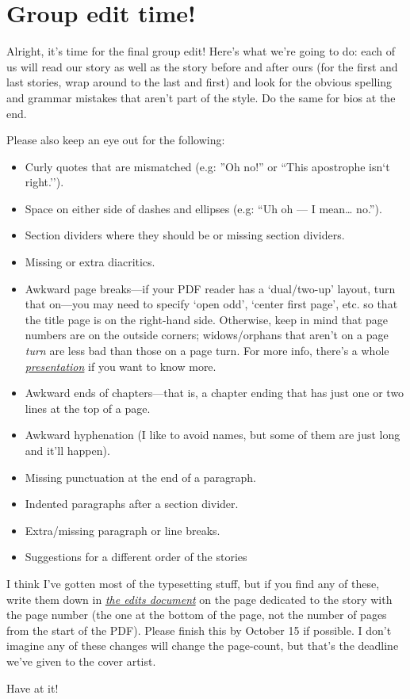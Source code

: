 \documentclass{memoir}
\begin{document}
\section*{Group edit time!}

Alright, it's time for the final group edit! Here's what we're going to do: each of us will read our story as well as the story before and after ours (for the first and last stories, wrap around to the last and first) and look for the obvious spelling and grammar mistakes that aren't part of the style. Do the same for bios at the end.

Please also keep an eye out for the following:

\begin{itemize}
  \item Curly quotes that are mismatched (e.g: ''Oh no!'' or ``This apostrophe isn`t right.'').
  \item Space on either side of dashes and ellipses (e.g: ``Uh oh --- I mean\ldots{} no.'').
  \item Section dividers where they should be or missing section dividers.
  \item Missing or extra diacritics.
\item Awkward page breaks---if your PDF reader has a `dual/two-up' layout, turn that on---you may need to specify `open odd', `center first page', etc. so that the title page is on the right-hand side. Otherwise, keep in mind that page numbers are on the outside corners; widows/orphans that aren't on a page \emph{turn} are less bad than those on a page turn. For more info, there's a whole \emph{\href{https://writing.drab-makyo.com/layout-and-design/}{presentation}} if you want to know more.
  \item Awkward ends of chapters---that is, a chapter ending that has just one or two lines at the top of a page.
  \item Awkward hyphenation (I like to avoid names, but some of them are just long and it'll happen).
  \item Missing punctuation at the end of a paragraph.
  \item Indented paragraphs after a section divider.
  \item Extra/missing paragraph or line breaks.
  \item Suggestions for a different order of the stories
\end{itemize}

I think I've gotten most of the typesetting stuff, but if you find any of these, write them down in \emph{\href{https://docs.google.com/document/d/15Nxm2nm1xkqlmeFr-Nmw2E1KVGYrnD0w5vPffdfcRUU/edit?usp=sharing}{the edits document}} on the page dedicated to the story with the page number (the one at the bottom of the page, not the number of pages from the start of the PDF). Please finish this by October 15 if possible. I don't imagine any of these changes will change the page-count, but that's the deadline we've given to the cover artist.

Have at it!
\end{document}
